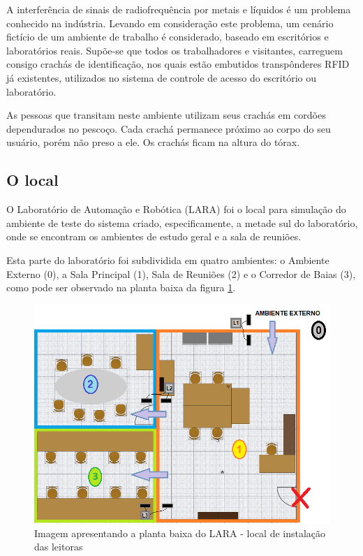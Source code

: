  A interferência de sinais de radiofrequência por metais e líquidos  é um problema conhecido na indústria. Levando em consideração este problema, um cenário fictício de um ambiente de trabalho é considerado, baseado em escritórios e laboratórios reais. Supõe-se que todos os trabalhadores e visitantes, carreguem consigo crachás de identificação, nos quais estão embutidos transpônderes RFID já existentes, utilizados no sistema de controle de acesso do escritório ou laboratório.
 
 As pessoas que transitam neste ambiente utilizam seus crachás em cordões dependurados no pescoço. Cada crachá permanece próximo ao corpo do seu usuário, porém não preso a ele. Os crachás ficam na altura do tórax.
 
 \subsection{O local}
 

 O Laboratório de Automação e Robótica (LARA) foi o local para simulação do ambiente de teste do sistema criado, especificamente, a metade sul do laboratório, onde se encontram os ambientes de estudo geral e a sala de reuniões.
 
 Esta parte do laboratório foi subdividida em quatro ambientes: o Ambiente Externo (0), a Sala Principal (1), Sala de Reuniões (2) e o Corredor de Baias (3), como pode ser observado na planta baixa da figura \ref{fig:LARA_planta}.

  \begin{figure}[H]
    \centering
    \includegraphics[width=0.9\linewidth]{figs/Metodologia/LARA_planta_ambientes.png}
    \caption{Imagem apresentando a planta baixa do LARA - local de instalação das leitoras}
    \label{fig:LARA_planta}
\end{figure}

